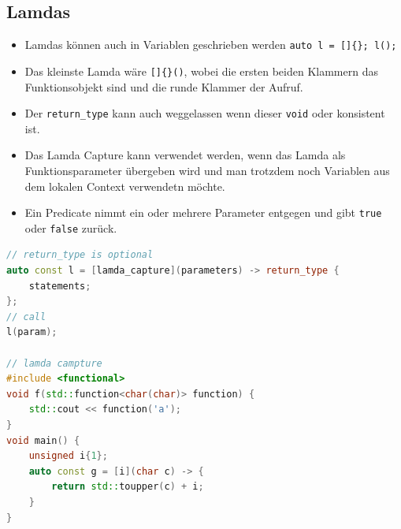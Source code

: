 \subsection{Lamdas}
\begin{itemize}
	\item Lamdas können auch in Variablen geschrieben werden \lstinline|auto l = []{}; l();|
	\item Das kleinste Lamda wäre \lstinline|[]{}()|, wobei die ersten beiden Klammern das Funktionsobjekt sind und die runde Klammer der Aufruf.
	\item Der \lstinline|return_type| kann auch weggelassen wenn dieser \lstinline|void| oder konsistent ist.
	\item Das Lamda Capture kann verwendet werden, wenn das Lamda als Funktionsparameter übergeben wird und man trotzdem noch Variablen aus dem lokalen Context verwendetn möchte.
	\item Ein Predicate nimmt ein oder mehrere Parameter entgegen und gibt \lstinline|true| oder \lstinline|false| zurück.
\end{itemize}
\begin{lstlisting}[language=C++]
// return_type is optional
auto const l = [lamda_capture](parameters) -> return_type {
	statements;
};
// call
l(param);

// lamda campture
#include <functional>
void f(std::function<char(char)> function) {
	std::cout << function('a');
}
void main() {
	unsigned i{1};
	auto const g = [i](char c) -> {
		return std::toupper(c) + i;
	}
}
\end{lstlisting}


